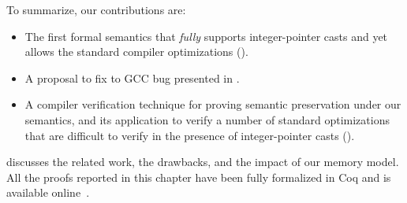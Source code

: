 \medskip \noindent
To summarize, our contributions are:
\begin{itemize}
\item The first formal semantics that \emph{fully} supports integer-pointer casts and yet allows the
  standard compiler optimizations ().

\item A proposal to fix to GCC bug presented in .

\item A compiler verification technique for proving semantic preservation under our semantics, and its
  application to verify a number of standard optimizations that are difficult to verify in the
  presence of integer-pointer casts ().
\end{itemize}

\noindent {} discusses the related work, the drawbacks, and the impact
of our memory model.  All the proofs reported in this chapter have been fully formalized in Coq and
is available online~\cite{kang-phd-thesis-web}.

%
%
%
%



